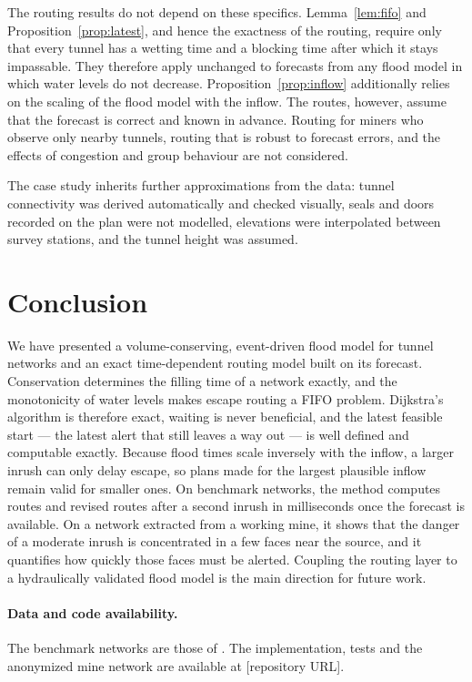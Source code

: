 \documentclass[11pt,a4paper]{article}
\theoremstyle{plain}
\theoremstyle{definition}
\theoremstyle{remark}
\begin{document}
The routing results do not depend on these specifics. Lemma~\ref{lem:fifo} and Proposition~\ref{prop:latest}, and hence the exactness of the routing, require only that every tunnel has a wetting time and a blocking time after which it stays impassable. They therefore apply unchanged to forecasts from any flood model in which water levels do not decrease. Proposition~\ref{prop:inflow} additionally relies on the scaling of the flood model with the inflow. The routes, however, assume that the forecast is correct and known in advance. Routing for miners who observe only nearby tunnels, routing that is robust to forecast errors, and the effects of congestion and group behaviour \cite{hamacher, lu} are not considered.

The case study inherits further approximations from the data: tunnel connectivity was derived automatically and checked visually, seals and doors recorded on the plan were not modelled, elevations were interpolated between survey stations, and the tunnel height was assumed.

\section{Conclusion}\label{sec:conclusion}

We have presented a volume-conserving, event-driven flood model for tunnel networks and an exact time-dependent routing model built on its forecast. Conservation determines the filling time of a network exactly, and the monotonicity of water levels makes escape routing a FIFO problem. Dijkstra's algorithm is therefore exact, waiting is never beneficial, and the latest feasible start --- the latest alert that still leaves a way out --- is well defined and computable exactly. Because flood times scale inversely with the inflow, a larger inrush can only delay escape, so plans made for the largest plausible inflow remain valid for smaller ones. On benchmark networks, the method computes routes and revised routes after a second inrush in milliseconds once the forecast is available. On a network extracted from a working mine, it shows that the danger of a moderate inrush is concentrated in a few faces near the source, and it quantifies how quickly those faces must be alerted. Coupling the routing layer to a hydraulically validated flood model is the main direction for future work.

\paragraph{Data and code availability.} The benchmark networks are those of \cite{cumcm}. The implementation, tests and the anonymized mine network are available at [repository URL].
\end{document}
